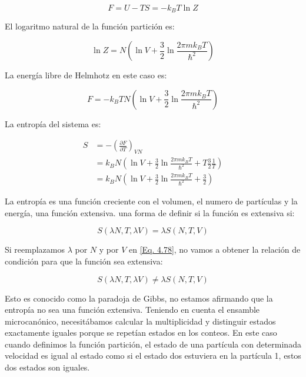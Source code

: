 \documentclass[11pt,fleqn]{book}
\begin{document}
\begin{equation}
        F=U-TS=-k_{B}T\ln{Z}
    \label{Eq. 4.75}
\end{equation}

El logaritmo natural de la función partición es:

\begin{equation}
        \ln{Z}=N\left(\ln{V} +\frac{3}{2}\ln{\frac{2\pi mk_{B}T}{\hslash^{2}}}\right)
    \label{Eq. 4.76}
\end{equation}

La energía libre de Helmhotz en este caso es:

\begin{equation}
        F=-k_{B}TN\left(\ln{V} +\frac{3}{2}\ln{\frac{2\pi mk_{B}T}{\hslash^{2}}}\right)
    \label{Eq. 4.77}
\end{equation}

La entropía del sistema es:

\begin{equation}
\begin{split}
            S&=-\left(\frac{\partial F}{\partial T}\right)_{VN}\\
            &=k_{B}N\left(\ln{V} +\frac{3}{2}\ln{\frac{2\pi mk_{B}T}{\hslash^{2}}}+T\frac{3}{2}\frac{1}{T}\right)\\
            &=k_{B}N\left(\ln{V} +\frac{3}{2}\ln{\frac{2\pi mk_{B}T}{\hslash^{2}}}+\frac{3}{2}\right)
            \end{split}
    \label{Eq. 4.78}
\end{equation}

La entropía es una función creciente con el volumen, el numero de partículas y la energía, una función extensiva. una forma de definir si la función es extensiva si:

\begin{equation}
    S(\lambda N, T, \lambda V)=\lambda S(N, T, V)
    \label{Eq. 4.79}
\end{equation}

Si reemplazamos $\lambda$ por $N$ y por $V$ en \ref{Eq. 4.78}, no vamos a obtener la relación de condición para que la función sea extensiva:

\begin{equation}
    S(\lambda N, T, \lambda V)\neq\lambda S(N, T, V)
    \label{Eq. 4.80}
\end{equation}

Esto es conocido como la paradoja de Gibbs, no estamos afirmando que la entropía no sea una función extensiva. Teniendo en cuenta el ensamble microcanónico, necesitábamos calcular la multiplicidad y distinguir estados exactamente iguales porque se repetían estados en los conteos. En este caso cuando definimos la función partición, el estado de una partícula con determinada velocidad es igual al estado como si el estado dos estuviera en la partícula 1, estos dos estados son iguales.
\end{document}
